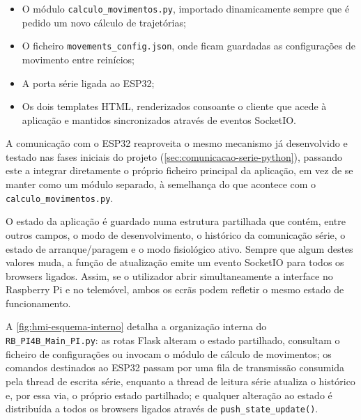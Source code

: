 \begin{itemize}
  \item O módulo \texttt{calculo\_movimentos.py}, importado dinamicamente sempre que é pedido um novo cálculo de trajetórias;
  \item O ficheiro \texttt{movements\_config.json}, onde ficam guardadas as configurações de movimento entre reinícios;
  \item A porta série ligada ao ESP32;
  \item Os dois templates HTML, renderizados consoante o cliente que acede à aplicação e mantidos sincronizados através de eventos SocketIO.
\end{itemize}

A comunicação com o ESP32 reaproveita o mesmo mecanismo já desenvolvido e testado nas fases iniciais do projeto (\cref{sec:comunicacao-serie-python}), passando este a integrar diretamente o próprio ficheiro principal da aplicação, em vez de se manter como um módulo separado, à semelhança do que acontece com o \texttt{calculo\_movimentos.py}.

O estado da aplicação é guardado numa estrutura partilhada que contém, entre outros campos, o modo de desenvolvimento, o histórico da comunicação série, o estado de arranque/paragem e o modo fisiológico ativo. Sempre que algum destes valores muda, a função de atualização emite um evento SocketIO para todos os browsers ligados. Assim, se o utilizador abrir simultaneamente a interface no Raspberry Pi e no telemóvel, ambos os ecrãs podem refletir o mesmo estado de funcionamento.

A \cref{fig:hmi-esquema-interno} detalha a organização interna do \texttt{RB\_PI4B\_Main\_PI.py}: as rotas Flask alteram o estado partilhado, consultam o ficheiro de configurações ou invocam o módulo de cálculo de movimentos; os comandos destinados ao ESP32 passam por uma fila de transmissão consumida pela thread de escrita série, enquanto a thread de leitura série atualiza o histórico e, por essa via, o próprio estado partilhado; e qualquer alteração ao estado é distribuída a todos os browsers ligados através de \texttt{push\_state\_update()}.

